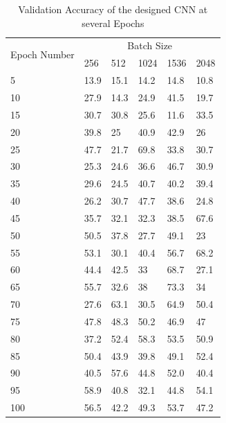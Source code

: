 \documentclass[conference]{IEEEtran}
\begin{document}
\begin{table}
     \begin{tabular}{| m{0.75cm} | m{1cm}| m{1cm} | m{1cm} | m{1cm} | m{1cm} |}
     \hline
        \multirow{2}{2em}{Epoch Number} & \multicolumn{5}{|c|}{Batch Size}\\ [1ex]
        \cline{2-6}
                     & 256 & 512 & 1024 & 1536 &  2048\\ [1ex]
        \hline\hline
                 5 	& 13.9 	& 15.1 	& 14.2 	& 14.8 & 10.8\\ [1ex]
         \hline
                 10	& 27.9	& 14.3	& 24.9	& 41.5 & 19.7\\ [1ex]
         \hline
                15	& 30.7	& 30.8	& 25.6	& 11.6 & 33.5\\ [1ex]
        \hline
                20	& 39.8	& 25	& 40.9	& 42.9 & 26\\ [1ex]
        \hline
                25	& 47.7	& 21.7	& 69.8	& 33.8 & 30.7\\ [1ex]
        \hline
                30	& 25.3	& 24.6	& 36.6	& 46.7 & 30.9\\ [1ex]
        \hline
                35	& 29.6	& 24.5	& 40.7	& 40.2 & 39.4\\ [1ex]
        \hline
                40	& 26.2	& 30.7	& 47.7	& 38.6 & 24.8\\ [1ex]
        \hline
                45	& 35.7	& 32.1	& 32.3	& 38.5 & 67.6\\ [1ex]
        \hline
                50	& 50.5	& 37.8	& 27.7	& 49.1 & 23\\ [1ex]
        \hline
                55	& 53.1	& 30.1	& 40.4	& 56.7 & 68.2\\ [1ex]
        \hline
                60	& 44.4	& 42.5	& 33	& 68.7 & 27.1\\ [1ex]
        \hline
                65	& 55.7	& 32.6	& 38	& 73.3 & 34\\ [1ex]
        \hline
                70	& 27.6	& 63.1	& 30.5	& 64.9 & 50.4\\ [1ex]
        \hline
                75	& 47.8	& 48.3	& 50.2	& 46.9 & 47\\ [1ex]
        \hline
                80	& 37.2	& 52.4	& 58.3	& 53.5 & 50.9\\ [1ex]
        \hline
                85	& 50.4	& 43.9	& 39.8	& 49.1 & 52.4\\ [1ex]
        \hline
                90	& 40.5	& 57.6	& 44.8	& 52.0 & 40.4\\ [1ex]
        \hline
                95	& 58.9	& 40.8	& 32.1	& 44.8 & 54.1\\ [1ex]
        \hline
                100	& 56.5	& 42.2	& 49.3	& 53.7 & 47.2\\ [1ex]
     \hline\hline
     \end{tabular}
 \caption{\label{table:result_epochs}Validation Accuracy of the designed CNN at several Epochs}
 \end{table}
\end{document}
